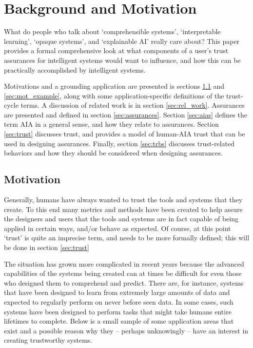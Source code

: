 \section{Background and Motivation} \label{sec:background}

What do people who talk about `comprehensible systems', `interpretable learning', `opaque systems', and `explainable AI' really care about? This paper provides a formal comprehensive look at what components of a user's trust assurances for intelligent systems would want to influence, and how this can be practically accomplished by intelligent systems.

Motivations and a grounding application are presented is sections \ref{sec:motivation} and \ref{sec:mot_example}, along with some application-specific definitions of the trust-cycle terms. A discussion of related work is in section \ref{sec:rel_work}. Assurances are presented and defined in section \ref{sec:assurances}.  Section \ref{sec:aias} defines the term AIA in a general sense, and how they relate to assurances. Section \ref{sec:trust} discusses trust, and provides a model of human-AIA trust that can be used in designing assurances. Finally, section \ref{sec:trbs} discusses trust-related behaviors and how they should be considered when designing assurances.

\subsection{Motivation} \label{sec:motivation}
    Generally, humans have always wanted to trust the tools and systems that they create.  To this end many metrics and methods have been created to help assure the designers and users that the tools and systems are in fact capable of being applied in certain ways, and/or behave as expected. Of course, at this point `trust' is quite an imprecise term, and needs to be more formally defined; this will be done in section \ref{sec:trust}

    The situation has grown more complicated in recent years because the advanced capabilities of the systems being created can at times be difficult for even those who designed them to comprehend and predict. There are, for instance, systems that have been designed to learn from extremely large amounts of data and expected to regularly perform on never before seen data. In some cases, such systems have been designed to perform tasks that might take humans entire lifetimes to complete. Below is a small sample of some application areas that exist and a possible reason why they -- perhaps unknowingly -- have an interest in creating trustworthy systems.
    

